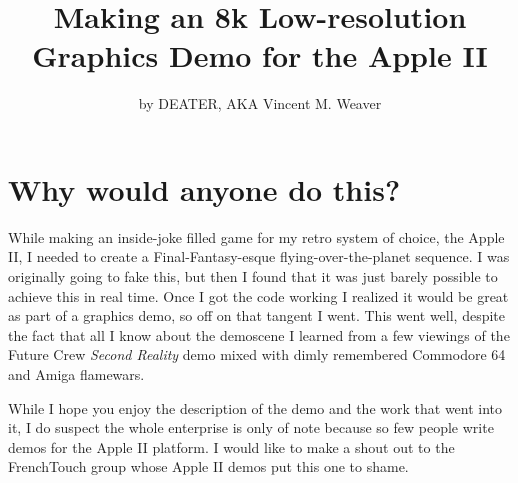 \documentclass[twocolumn]{article}
\begin{document}
\title{Making an 8k Low-resolution Graphics Demo for the Apple II}
\author{by DEATER, AKA Vincent M. Weaver}
\date{}
\maketitle

\section{Why would anyone do this?}

While making an inside-joke filled game for my retro system of choice,
the Apple II, I needed to create a Final-Fantasy-esque
flying-over-the-planet sequence.
I was originally going to fake this, but then I found that it was just barely
possible to achieve this in real time.
Once I got the code working I realized it would be great as part of a
graphics demo, so off on that tangent I went.
This went well, despite the fact that all I know about the demoscene I learned
from a few viewings of the Future Crew {\em Second Reality} demo mixed with
dimly remembered Commodore 64 and Amiga flamewars.



While I hope you enjoy the description of the demo and the work that
went into it, I do suspect the whole enterprise is only of note
because so few people write demos for the Apple II platform.
I would like to make a shout out to the FrenchTouch group whose Apple II
demos put this one to shame.


\end{document}
